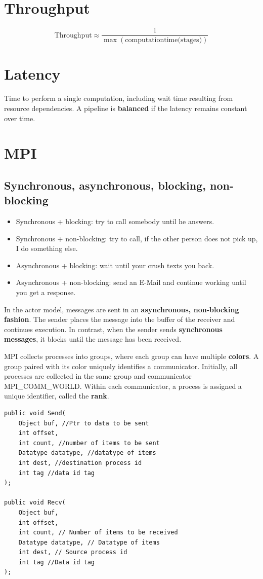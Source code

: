 \documentclass{article}
\begin{document}
\section{Throughput}
\begin{equation}
    \text{Throughput} \approx \frac{1}{\max(\text{computationtime(stages)})}
\end{equation}

\section{Latency}
Time to perform a single computation, including wait time resulting from resource dependencies. A pipeline is \textbf{balanced} if the latency remains constant over time.

\section{MPI}
\subsection{Synchronous, asynchronous, blocking, non-blocking}
\begin{itemize}
    \item Synchronous + blocking: try to call somebody until he answers.
    \item Synchronous + non-blocking: try to call, if the other person does not pick up, I do something else.
    \item Asynchronous + blocking: wait until your crush texts you back.
    \item Asynchronous + non-blocking: send an E-Mail and continue working until you get a response.
\end{itemize}
In the actor model, messages are sent in an \textbf{asynchronous, non-blocking fashion}. The sender places the message into the buffer of the receiver and continues execution. In contrast, when the sender sends \textbf{synchronous messages}, it blocks until the message has been received.

MPI collects processes into groups, where each group can have multiple \textbf{colors}. A group paired with its color uniquely identifies a communicator. Initially, all processes are collected in the same group and communicator MPI\_COMM\_WORLD. Within each communicator, a process is assigned a unique identifier, called the \textbf{rank}.

\begin{lstlisting}[style=java]
public void Send(
    Object buf, //Ptr to data to be sent
    int offset,
    int count, //number of items to be sent
    Datatype datatype, //datatype of items
    int dest, //destination process id
    int tag //data id tag
);

public void Recv(
    Object buf,
    int offset,
    int count, // Number of items to be received
    Datatype datatype, // Datatype of items
    int dest, // Source process id
    int tag //Data id tag
);
\end{lstlisting}
\end{document}
